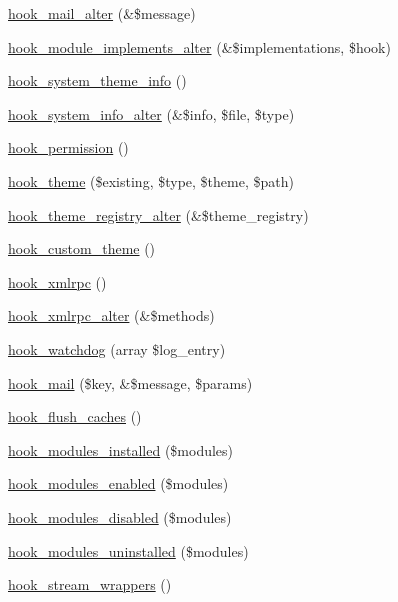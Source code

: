 \begin{DoxyCompactItemize}
\hyperlink{group__hooks_gaad1d55a8e7b359933f462a9ca5b2ede0}{hook\_\-mail\_\-alter} (\&\$message)
\item 
\hyperlink{group__hooks_gab71c322e6487a3b99bd04c5b9adb13f6}{hook\_\-module\_\-implements\_\-alter} (\&\$implementations, \$hook)
\item 
\hyperlink{group__hooks_gaf21de71044d5a79bde481d2383e12c9a}{hook\_\-system\_\-theme\_\-info} ()
\item 
\hyperlink{group__hooks_ga7dd7f887131916d5bbbb02ae87a9113e}{hook\_\-system\_\-info\_\-alter} (\&\$info, \$file, \$type)
\item 
\hyperlink{group__hooks_ga2b22b45f4925f2478412477bae329713}{hook\_\-permission} ()
\item 
\hyperlink{group__hooks_ga013ccb45c7aaab1c16cf9691428c910d}{hook\_\-theme} (\$existing, \$type, \$theme, \$path)
\item 
\hyperlink{group__hooks_gadd6cabb9ce825efccefb4918321932a5}{hook\_\-theme\_\-registry\_\-alter} (\&\$theme\_\-registry)
\item 
\hyperlink{group__hooks_gab83dce4ef80bc5005ee0de98fc005b1f}{hook\_\-custom\_\-theme} ()
\item 
\hyperlink{group__hooks_ga9debe627e55ecff58ffaf71689dbec2e}{hook\_\-xmlrpc} ()
\item 
\hyperlink{group__hooks_ga78ca7e3728a28b5d22152168b2b264cf}{hook\_\-xmlrpc\_\-alter} (\&\$methods)
\item 
\hyperlink{group__hooks_gab2b8bf0289fad4b39485e933012f290c}{hook\_\-watchdog} (array \$log\_\-entry)
\item 
\hyperlink{group__hooks_gacdeb1cba0d0a86ac4de3fff7d4765777}{hook\_\-mail} (\$key, \&\$message, \$params)
\item 
\hyperlink{group__hooks_ga66531e6e564157b7ca45ed07549c9b97}{hook\_\-flush\_\-caches} ()
\item 
\hyperlink{group__hooks_ga71b7268520567cac1a2f296c205e5227}{hook\_\-modules\_\-installed} (\$modules)
\item 
\hyperlink{group__hooks_ga0eb7c67333e0f40b4a46c0dc4c4a92f3}{hook\_\-modules\_\-enabled} (\$modules)
\item 
\hyperlink{group__hooks_ga591c577fba8ca8dc8ec17f8bf80bdc4c}{hook\_\-modules\_\-disabled} (\$modules)
\item 
\hyperlink{group__hooks_ga4f29c7343438068a922459cbe0810279}{hook\_\-modules\_\-uninstalled} (\$modules)
\item 
\hyperlink{group__hooks_ga6fadcf625a4766e7f0d97b1628b294dc}{hook\_\-stream\_\-wrappers} ()

\end{DoxyCompactItemize}
